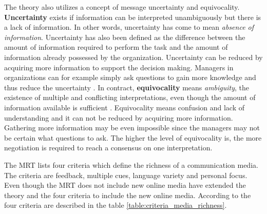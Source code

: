 \documentclass[english,12pt,a4paper,pdftex]{article}
\begin{document}
The theory also utilizes a concept of message uncertainty and equivocality. \textbf{Uncertainty} exists if information can be interpreted unambiguously but there is a lack of information. In other words, uncertainty has come to mean \textit{absence of information}. Uncertainty has also been defined as the difference between the amount of information required to perform the task and the amount of information already possessed by the organization. Uncertainty can be reduced by acquiring more information to support the decision making. Managers in organizations can for example simply ask questions to gain more knowledge and thus reduce the uncertainty \citep{daft1987}. In contract, \textbf{equivocality} means \textit{ambiguity}, the existence of multiple and conflicting interpretations, even though the amount of information available is sufficient \citep{daft1987}. Equivocality means confusion and lack of understanding and it can not be reduced by acquiring more information. Gathering more information may be even impossible since the managers may not be certain what questions to ask. The higher the level of equivocality is, the more negotiation is required to reach a consensus on one interpretation.

The \ac{MRT} lists four criteria which define the richness of a communication media. The criteria are feedback, multiple cues, language variety and personal focus. Even though the \ac{MRT} does not include new online media \citet{graveline2000} have extended the theory and the four criteria to include the new online media. According to \citet{graveline2000} the four criteria are described in the table \ref{table:criteria_media_richness}.
\end{document}
